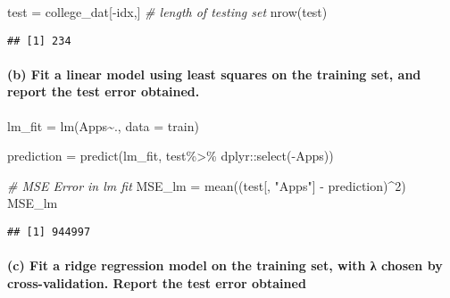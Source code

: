 \documentclass[
]{article}
\newenvironment{Shaded}{\begin{snugshade}}{\end{snugshade}}
\newcommand{\AttributeTok}[1]{\textcolor[rgb]{0.77,0.63,0.00}{#1}}
\newcommand{\CommentTok}[1]{\textcolor[rgb]{0.56,0.35,0.01}{\textit{#1}}}
\newcommand{\DecValTok}[1]{\textcolor[rgb]{0.00,0.00,0.81}{#1}}
\newcommand{\FunctionTok}[1]{\textcolor[rgb]{0.00,0.00,0.00}{#1}}
\newcommand{\NormalTok}[1]{#1}
\newcommand{\OtherTok}[1]{\textcolor[rgb]{0.56,0.35,0.01}{#1}}
\newcommand{\SpecialCharTok}[1]{\textcolor[rgb]{0.00,0.00,0.00}{#1}}
\newcommand{\StringTok}[1]{\textcolor[rgb]{0.31,0.60,0.02}{#1}}
\begin{document}
\begin{Shaded}
\begin{Highlighting}[]
\NormalTok{test }\OtherTok{=}\NormalTok{ college\_dat[}\SpecialCharTok{{-}}\NormalTok{idx,]}
\CommentTok{\# length of testing set}
\FunctionTok{nrow}\NormalTok{(test)}
\end{Highlighting}
\end{Shaded}

\begin{verbatim}
## [1] 234
\end{verbatim}

\hypertarget{b-fit-a-linear-model-using-least-squares-on-the-training-set-and-report-the-test-error-obtained.}{%
\paragraph{(b) Fit a linear model using least squares on the training
set, and report the test error
obtained.}\label{b-fit-a-linear-model-using-least-squares-on-the-training-set-and-report-the-test-error-obtained.}}

\begin{Shaded}
\begin{Highlighting}[]
\NormalTok{lm\_fit }\OtherTok{=} \FunctionTok{lm}\NormalTok{(Apps}\SpecialCharTok{\textasciitilde{}}\NormalTok{., }\AttributeTok{data =}\NormalTok{ train)}


\NormalTok{prediction }\OtherTok{=} \FunctionTok{predict}\NormalTok{(lm\_fit, test}\SpecialCharTok{\%\textgreater{}\%}\NormalTok{ dplyr}\SpecialCharTok{::}\FunctionTok{select}\NormalTok{(}\SpecialCharTok{{-}}\NormalTok{Apps))}

\CommentTok{\# MSE Error in lm fit}
\NormalTok{MSE\_lm }\OtherTok{=} \FunctionTok{mean}\NormalTok{((test[, }\StringTok{"Apps"}\NormalTok{] }\SpecialCharTok{{-}}\NormalTok{ prediction)}\SpecialCharTok{\^{}}\DecValTok{2}\NormalTok{)}
\NormalTok{MSE\_lm}
\end{Highlighting}
\end{Shaded}

\begin{verbatim}
## [1] 944997
\end{verbatim}

\hypertarget{c-fit-a-ridge-regression-model-on-the-training-set-with-ux3bb-chosen-by-cross-validation.-report-the-test-error-obtained}{%
\paragraph{(c) Fit a ridge regression model on the training set, with λ
chosen by cross-validation. Report the test error
obtained}\label{c-fit-a-ridge-regression-model-on-the-training-set-with-ux3bb-chosen-by-cross-validation.-report-the-test-error-obtained}}
\end{document}
